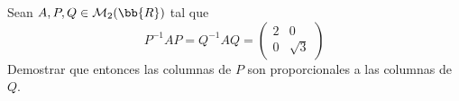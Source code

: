 \begin{ejercicio}
    Sean $A,P,Q \in \mathcal{M}_2(\bb{R})$ tal que
    $$P^{-1}AP = Q^{-1}AQ = \left( \begin{array}{cc}
        2 & 0 \\
        0 & \sqrt{3}
    \end{array} \right)$$
    Demostrar que entonces las columnas de $P$ son proporcionales a las columnas de $Q$.
    \begin{comment}
    \begin{proof}
        Sea $X=P^{-1}AP$, $Y=Q^{-1}AQ$ y $D=\left( \begin{array}{cc}
            2 & 0 \\
            0 & \sqrt{3}
        \end{array} \right) = X=Y$
        
        Usando el isomorfismo entre endomorfismos y matrices cuadradas, sea $f\in~End(V^2)$ tal que $M(f, \mathcal{B}) = A$. Como $A\sim X$ y $A\sim  Y$, las tres matrices representan al mismo endomorfismo pero en distintas bases.
        $$X=M(f; \mathcal{B}_1) \qquad Y=M(f; \mathcal{B}_2) \qquad A=M(f; \mathcal{B}_3)$$

        Debido a la matriz $D$, sabemos que $V_2 \oplus V_{\sqrt{3}} = V^2(\bb{R})$. Los valores propios del endomorfismo con multiplicidad algebraica y geométrica 1 son: $\{2,  \sqrt{3}\}$. Como $X=Y=D$, sabemos que $\mathcal{B}_1$ y $\mathcal{B}_2$ son bases de vectores propios.

        Como la multiplicidad geométrica es $1$, sea $\{e_1\}$ base de $V_2$ y $\{e_2\}$ base de $V_{\sqrt{3}}$. Debido a la suma directa, sea $\mathcal{B}_1 =~\{e_1, e_2\}$.
        
        \vspace{5cm}
        Sea ahora $\mathcal{B}_2 = \{\bar{e_1}, \bar{e_1}\}$, con $\bar{e_1} \in V_2,\;\bar{e_1}\in V_{\sqrt{3}}$.
        \begin{itemize}
            \item Como $\bar{e_1} \in V_2 \Longrightarrow \bar{e_1} = ae_1$, con $a\neq 0$.
            \item Como $\bar{e_2} \in V_{\sqrt{3}} \Longrightarrow \bar{e_2} = be_2$, con $b\neq 0$.
        \end{itemize}
        Por tanto, los vectores de $\mathcal{B}_2$ son proporcionales a los vectores de $\mathcal{B}_1$. Veamos ahora que las columnas de $P$ y $Q$ también son proporcionales:
        \begin{itemize}
            \item $P=M(\mathcal{B}_1; \mathcal{B}_3) \Longrightarrow P$ tiene como columnas los vectores de $\mathcal{B}_1$ en la base $\mathcal{B}_3$.


\end{comment}
\end{ejercicio}
